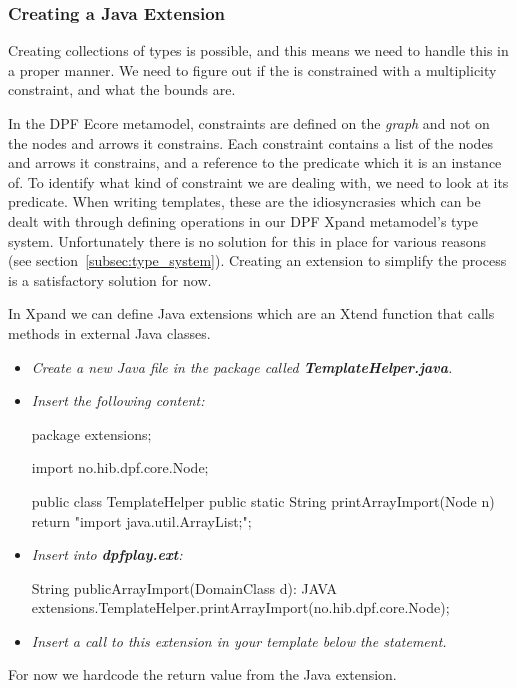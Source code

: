 \subsubsection{Creating a Java Extension}
Creating collections of  types is possible, and this means we need to handle this in a proper manner. We need to figure out if the  is constrained with a multiplicity constraint, and what the bounds are. 

In the DPF Ecore metamodel, constraints are defined on the \emph{graph} and not on the nodes and arrows it constrains\footnotemark. Each constraint contains a list of the nodes and arrows it constrains, and a reference to the predicate which it is an instance of. To identify what kind of constraint we are dealing with, we need to look at its predicate. When writing templates, these are the idiosyncrasies which can be dealt with through defining operations in our DPF Xpand metamodel's type system. Unfortunately there is no solution for this in place for various reasons (see section~\ref{subsec:type_system}). Creating an extension to simplify the process is a satisfactory solution for now.

In Xpand we can define Java extensions which are an Xtend function that calls methods in external Java classes.


\begin{itemize}
  \item \emph{Create a new Java file in the  package called \textbf{TemplateHelper.java}.}
  \item \emph{Insert the following content:}
  \begin{plainlisting}
package extensions;

import no.hib.dpf.core.Node;

public class TemplateHelper {
    public static String printArrayImport(Node n) {
	return "import java.util.ArrayList;"; 
    }
}
  \end{plainlisting}
  \newpage
  \item \emph{Insert into \textbf{dpfplay.ext}:}
  \begin{plainlisting}
String publicArrayImport(DomainClass d):
    JAVA extensions.TemplateHelper.printArrayImport(no.hib.dpf.core.Node); 
  \end{plainlisting}
  \item \emph{Insert a call to this extension in your template below the  statement.}
\end{itemize}
For now we hardcode the return value from the Java extension. 

